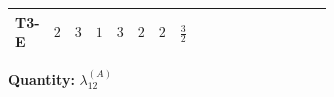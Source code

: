 \documentclass[8pt]{article}
\begin{document}
\begin{landscape}
\begin{longtable}{@{}llcccccc >{\raggedright\arraybackslash}p{0.21\linewidth} >{\raggedright\arraybackslash}p{0.21\linewidth} >{\raggedright\arraybackslash}p{0.21\linewidth}@{}}
\midrule
T3-E & $2$ & $3$ & $1$ & $3$ & $2$ & $2$ & $\frac{3}{2}$ & \scriptsize\adjustbox{max width=\linewidth}{$\begin{gathered} {\lambda_{12}^{(A)}} \left(2 T_{\nu}^{(1)}+2 T_{\nu}^{(2)}+\frac{16 {\lambda_{12}^{(\times)}}}{3}\right)\end{gathered}$} & \scriptsize\adjustbox{max width=\linewidth}{$\begin{gathered} +16 {\lambda_{12}^{(A)}} {\lambda_{S_1}^{(A)}}\end{gathered}$} & \scriptsize\adjustbox{max width=\linewidth}{$\begin{gathered} +16 {\lambda_{12}^{(A)}} {\lambda_{S_2}^{(A)}}\end{gathered}$} \\
\midrule
\bottomrule
\end{longtable}
\clearpage
\noindent\textbf{Quantity: }$\lambda_{12}^{(A)}$\par\smallskip

\end{landscape}
\end{document}
